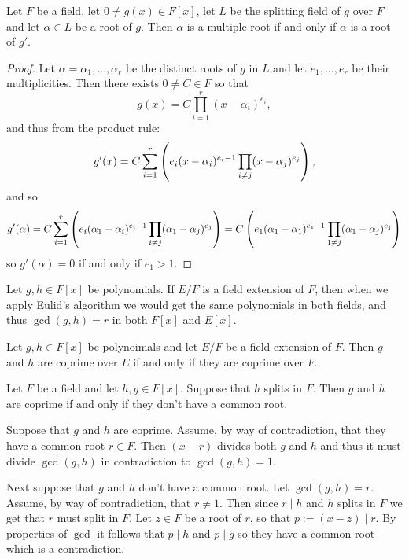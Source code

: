 \documentclass[11pt,a4paper]{article}
\begin{document}
\begin{lemma}
  Let $F$ be a field,
  let $0 \neq g(x) \in F[x]$,
  let $L$ be the splitting field of $g$ over $F$
  and let $\alpha \in L$ be a root of $g$.
  Then $\alpha$ is a multiple root if and only if $\alpha$ is a root
  of $g'$.
\end{lemma}
\begin{proof}
  Let $\alpha = \alpha_1,\dots,\alpha_r$ be the distinct roots of $g$
  in $L$ and let $e_1,\dots,e_r$ be their multiplicities.
  Then there exists $0 \neq C \in F$ so that
  \[
    g(x) = C \prod_{i=1}^{r} (x - \alpha_i)^{e_i},
  \]
  and thus from the product rule:
  \[
    g'(x) =
    C \sum_{i=1}^{r}
    \del{e_i (x - \alpha_i)^{e_i - 1} \prod_{i \neq j} (x - \alpha_j)^{e_j}},
  \]
  and so
  \[
    g'(\alpha) =
    C \sum_{i=1}^{r}
    \del{e_i (\alpha_1 - \alpha_i)^{e_i - 1}
    \prod_{i \neq j} (\alpha_1 - \alpha_j)^{e_j}} =
    C
    \del{e_1 (\alpha_1 - \alpha_1)^{e_1 - 1}
    \prod_{1 \neq j} (\alpha_1 - \alpha_j)^{e_j}}
  \]
  so $g'(\alpha) = 0$ if and only if $e_1 > 1$.
\end{proof}


\begin{remark}
  Let $g,h \in F[x]$ be polynomials.
  If $E/F$ is a field extension of $F$,
  then when we apply Eulid's algorithm
  we would get the same polynomials in both fields, and thus
  $\gcd(g,h) = r$ in both $F[x]$ and $E[x]$.
\end{remark}

\begin{corollary}
  \label{cor:euclid}
  Let $g,h \in F[x]$ be polynoimals and let $E/F$ be a field extension
  of $F$.
  Then $g$ and $h$ are coprime over $E$ if and only if they are
  coprime over $F$.
\end{corollary}

\begin{exercise}
  \label{ex:coprime-iff-no-common-root}
  Let $F$ be a field and let $h,g \in F[x]$.
  Suppose that $h$ splits in $F$.
  Then $g$ and $h$ are coprime if and only if they don't have a common
  root.
\end{exercise}
\begin{solution}
  Suppose that $g$ and $h$ are coprime.
  Assume, by way of contradiction, that they have a common root $r \in F$.
  Then $(x - r)$ divides both $g$ and $h$ and thus it must divide
  $\gcd(g,h)$ in contradiction to $\gcd(g,h) = 1$.

  Next suppose that $g$ and $h$ don't have a common root.
  Let $\gcd(g,h) = r$.
  Assume, by way of contradiction, that $r \neq 1$.
  Then since $r \mid h$ and $h$ splits in $F$
  we get that $r$ must split in $F$.
  Let $z \in F$ be a root of $r$,
  so that $p := (x - z) \mid r$.
  By properties of $\gcd$ it follows that $p \mid h$ and $p \mid g$
  so they have a common root which is a contradiction.
\end{solution}
\end{document}
